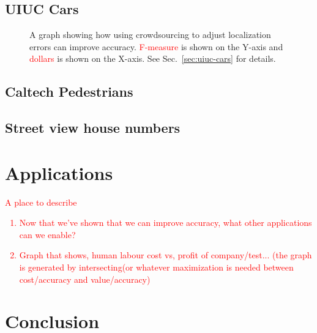 \documentclass[10pt,twocolumn,letterpaper]{article}
\newcommand{\preliminary}[1]{\textcolor{red}{#1}}
\begin{document}
\subsection{UIUC Cars}
\begin{figure}[t]
\caption{A graph showing how using crowdsourcing to adjust localization errors can improve accuracy. \preliminary{F-measure} is shown on the Y-axis and \preliminary{dollars} is shown on the X-axis. See Sec.~\ref{sec:uiuc-cars} for details.}
\end{figure}

\subsection{Caltech Pedestrians}
\subsection{Street view house numbers}


\section{Applications}
\preliminary{
A place to describe
\begin{enumerate}
\item Now that we've shown that we can improve accuracy, what other applications can we enable?
\item Graph that shows, human labour cost vs, profit of company/test... (the graph is generated by intersecting(or whatever maximization is needed between cost/accuracy and value/accuracy)
\end{enumerate}
}

\section{Conclusion}



{\small


}
\end{document}

